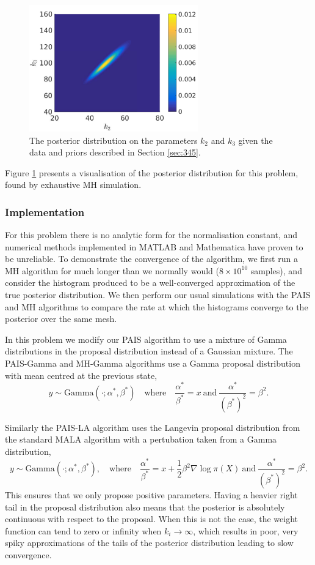 \documentclass[final]{siamltex}
\begin{document}
\begin{figure}[htb]
\centering
\includegraphics[width=0.65\textwidth]{"figures/C1_posterior"}
\caption{The posterior distribution on the parameters $k_2$ and $k_3$
  given the data and priors described in Section \ref{sec:345}.}
\label{fig:345}
\end{figure}

Figure \ref{fig:345} presents a visualisation of the posterior
distribution for this problem, found by exhaustive MH simulation.

\subsubsection{Implementation}\label{sec:chem_implementation}
For this problem there is no analytic form for the normalisation
constant, and numerical methods implemented in MATLAB and Mathematica
have proven to be unreliable. To demonstrate the convergence of the
algorithm, we first run a MH algorithm for much longer than we
normally would ($8\times 10^{10}$ samples), and consider the histogram
produced to be a well-converged approximation of the true posterior
distribution. We then perform our usual simulations with the PAIS and
MH algorithms to compare the rate at which the histograms converge to
the posterior over the same mesh.

In this problem we modify our PAIS algorithm to use a mixture of Gamma
distributions in the proposal distribution instead of a Gaussian
mixture. The PAIS-Gamma and MH-Gamma algorithms use a Gamma
proposal distribution with mean centred at the previous state,
\[
	y \sim \text{Gamma}(\cdot;\alpha^*, \beta^*) \quad \text{where} \quad \frac{\alpha^*}{\beta^*} = x \ \text{and} \ \frac{\alpha^*}{(\beta^*)^2} = \beta^2.
\]

Similarly the PAIS-LA algorithm uses the Langevin proposal distribution
from the standard MALA algorithm with a pertubation taken from a Gamma
distribution,
\[
	y \sim \text{Gamma}(\cdot; \alpha^*, \beta^*), \quad \text{where} \quad \frac{\alpha^*}{\beta^*} = x+\frac{1}{2}\beta^2\nabla\log\pi(X) \ \text{and} \ \frac{\alpha^*}{(\beta^*)^2} = \beta^2.
\]
This ensures that we only propose positive
parameters. Having a heavier right tail in the proposal distribution
also means that the posterior is absolutely continuous with respect to
the proposal. When this is not the case, the weight function can tend
to zero or infinity when $k_i \rightarrow \infty$, which results in
poor, very spiky approximations of the tails of the posterior distribution leading to slow convergence.
\end{document}
